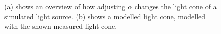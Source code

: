 \begin{figure}
	\centering     %
	\caption{(a) shows an overview of how adjusting $\alpha$ changes the light cone of a simulated light source. (b) shows a modelled light cone, modelled with the shown measured light cone.\label{fig:cones_of_light}}
\end{figure}

